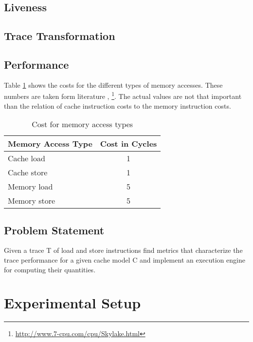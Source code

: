 \documentclass[onecolumn, openany, master, english, seal, signatures]{dbrgrptt}
\begin{document}
\section{Liveness}\label{sec:liveness}

\section{Trace Transformation}\label{sec:trace-transformation}

\section{Performance}\label{sec:performance}

Table \ref{tab:memory-access-cost} shows the costs for the different types of memory accesses. These numbers are taken form literature \cite{drepper2007every}, \footnote{\url{http://www.7-cpu.com/cpu/Skylake.html}}. The actual values are not that important than the relation of cache instruction costs to the memory instruction costs.
\begin{table}
  \centering
  \begin{tabular}{lc}
  \hline
  Memory Access Type & Cost in Cycles \\
  \hline
  Cache  load  & 1 \\
  Cache  store & 1 \\
  Memory load  & 5 \\
  Memory store & 5 \\
  \hline
  \end{tabular}
  \caption{Cost for memory access types}
  \label{tab:memory-access-cost}
\end{table}

\section{Problem Statement}
Given a trace T of load and store instructions find metrics that characterize the trace performance for a given cache model C and implement an execution engine for computing their quantities.

\chapter{Experimental Setup}
\end{document}
